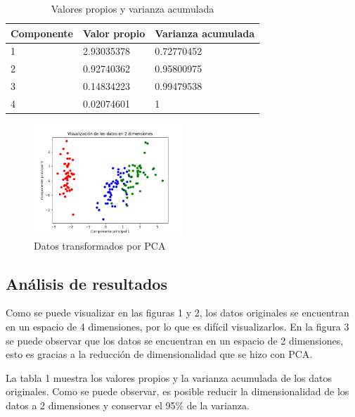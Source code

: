 \documentclass[conference]{IEEEtran}
\begin{document}
\begin{table}[H]
\centering
\caption{Valores propios y varianza acumulada}
\label{my-label}
\begin{tabular}{|l|l|l|}
\hline
\textbf{Componente} & \textbf{Valor propio} & \textbf{Varianza acumulada} \\ \hline
1                   & 2.93035378            & 0.72770452                  \\ \hline
2                   & 0.92740362            & 0.95800975                  \\ \hline
3                   & 0.14834223            & 0.99479538                  \\ \hline
4                   & 0.02074601            & 1                           \\ \hline
\end{tabular}
\end{table}

\begin{figure}[H]
    \centering
    \includegraphics[width=0.5\textwidth]{images/pca.png}
    \caption{Datos transformados por PCA}
    \label{fig:my_label}
\end{figure}




\subsection{Análisis de resultados}
Como se puede visualizar en las figuras 1 y 2, los datos originales se encuentran en un espacio de 4 dimensiones, por lo que es difícil visualizarlos. En la figura 3 se puede observar que los datos se encuentran en un espacio de 2 dimensiones, esto es gracias a la reducción de dimensionalidad que se hizo con PCA.

La tabla 1 muestra los valores propios y la varianza acumulada de los datos originales. Como se puede observar, es posible reducir la dimensionalidad de los datos a 2 dimensiones y conservar el 95\% de la varianza.
\end{document}
